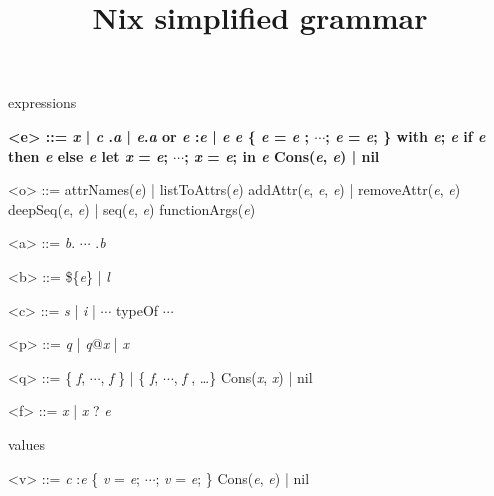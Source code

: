 \documentclass{article}
\title{Nix simplified grammar}
\date{}
\newcommand{\meta}[1]{{\it{#1}}} %
\renewcommand{\|}{\textrm{|}}
\def\e/{\meta{e}}
\def\a/{\meta{a}}
\def\b/{\meta{b}}
\def\c/{\meta{c}}
\def\p/{\meta{p}}
\def\q/{\meta{q}}
\def\f/{\meta{f}}
\def\x/{\meta{x}}
\def\o/{\meta{o}}
\def\v/{\meta{v}}
\begin{document}
\maketitle{}

\par{expressions}

\begin{grammar}
  \bfseries
  <e> ::=
    \x/ \| \c/
    \alt \e/.\a/ \| \e/.\a/ or \e/
    \alt \p/:\e/ \| \e/ \e/
    \alt \{ \e/ = \e/ ; $\cdots{}$; \e/ = \e/; \}
    \alt with \e/; \e/
    \alt if \e/ then \e/ else \e/
    \alt let \x/ = \e/; $\cdots{}$; \x/ = \e/; in \e/
    \alt Cons(\e/, \e/) \| nil
    \alt \o/

    <o> ::= attrNames(\e/) \| listToAttrs(\e/)
    \alt addAttr(\e/, \e/, \e/) \| removeAttr(\e/, \e/)
    \alt deepSeq(\e/, \e/) \| seq(\e/, \e/)
    \alt functionArgs(\e/)

  <a> ::= \b/. $\cdots{}$ .\b/

  <b> ::= \$\{\e/\} \| \meta{l}

  <c> ::= \meta{s} \| \meta{i} \| $\cdots{}$
    \alt typeOf
    \alt $\cdots{}$

  <p> ::= \q/ \| \q/@\x/ \| \x/

  <q> ::= \{ \f/, $\cdots{}$, \f/ \} \| \{ \f/, $\cdots{}$, \f/ , \ldots{}\}
    \alt Cons(\x/, \x/) \| nil
    \alt \c/

  <f> ::= \x/ \| \x/ ? \e/

\end{grammar}

\par{values}

\begin{grammar}
  \bfseries

  <v> ::=
    \c/
    \alt \p/:\e/
    \alt \{ \v/ = \e/; $\cdots{}$; \v/ = \e/; \}
    \alt Cons(\e/, \e/) \| nil
\end{grammar}
\end{document}
